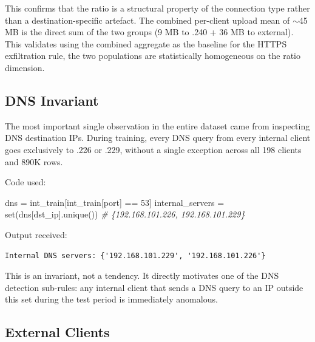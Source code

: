 \documentclass[
  11pt,
]{article}
\newenvironment{Shaded}{\vspace{4pt}}{\vspace{4pt}}
\newcommand{\BuiltInTok}[1]{\textcolor[rgb]{0.00,0.50,0.00}{#1}}
\newcommand{\CommentTok}[1]{\textcolor[rgb]{0.38,0.63,0.69}{\textit{#1}}}
\newcommand{\DecValTok}[1]{\textcolor[rgb]{0.25,0.63,0.44}{#1}}
\newcommand{\NormalTok}[1]{#1}
\newcommand{\OperatorTok}[1]{\textcolor[rgb]{0.40,0.40,0.40}{#1}}
\newcommand{\StringTok}[1]{\textcolor[rgb]{0.25,0.44,0.63}{#1}}
\begin{document}
This confirms that the ratio is a structural property of the connection
type rather than a destination-specific artefact. The combined
per-client upload mean of $\sim$45 MB is the direct sum of the
two groups (9 MB to .240 + 36 MB to external). This validates using the
combined aggregate as the baseline for the HTTPS exfiltration rule, the
two populations are statistically homogeneous on the ratio dimension.

\hypertarget{dns-invariant}{%
\subsection{DNS Invariant}\label{dns-invariant}}

The most important single observation in the entire dataset came from
inspecting DNS destination IPs. During training, every DNS query from
every internal client goes exclusively to .226 or .229, without a single
exception across all 198 clients and 890K rows.

Code used:

\begin{Shaded}
\begin{Highlighting}[]
\NormalTok{dns }\OperatorTok{=}\NormalTok{ int\_train[int\_train[}\StringTok{\textquotesingle{}port\textquotesingle{}}\NormalTok{] }\OperatorTok{==} \DecValTok{53}\NormalTok{]}
\NormalTok{internal\_servers }\OperatorTok{=} \BuiltInTok{set}\NormalTok{(dns[}\StringTok{\textquotesingle{}dst\_ip\textquotesingle{}}\NormalTok{].unique())}
\CommentTok{\# \{\textquotesingle{}192.168.101.226\textquotesingle{}, \textquotesingle{}192.168.101.229\textquotesingle{}\}}
\end{Highlighting}
\end{Shaded}

Output received:

\begin{verbatim}
Internal DNS servers: {'192.168.101.229', '192.168.101.226'}
\end{verbatim}

This is an invariant, not a tendency. It directly motivates one of the
DNS detection sub-rules: any internal client that sends a DNS query to
an IP outside this set during the test period is immediately anomalous. 

\hypertarget{external-clients}{%
\subsection{External Clients}\label{external-clients}}
\end{document}
